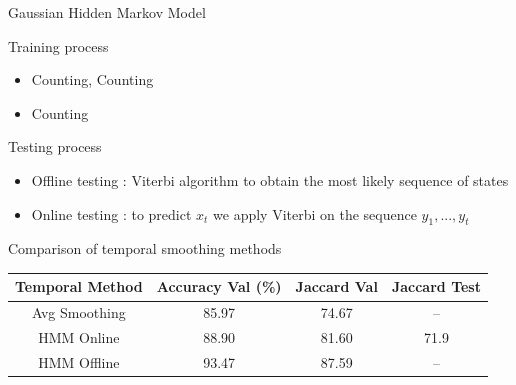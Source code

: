 \begin{frame}{Gaussian Hidden Markov Model}
	
	\begin{block}{Training process}
		\begin{itemize}
			\item Counting, Counting
			\item Counting
		\end{itemize}
	\end{block}
	
	\begin{block}{Testing process}
		\begin{itemize}
			\item Offline testing : Viterbi algorithm to obtain the most likely sequence of states
			\item Online testing : to predict $x_t$ we apply Viterbi on the sequence $y_1,...,y_t$
		\end{itemize}
	\end{block}

\end{frame}
	

\begin{frame}{Comparison of temporal smoothing methods}

	\begin{table}
	\begin{center}
		\begin{tabular}{|c|c|c|c|}
			\hline
			Temporal Method & Accuracy Val (\%) & Jaccard Val & Jaccard Test \\
			\hline\hline
			Avg Smoothing & 85.97 & 74.67 & -- \\
			HMM Online & 88.90 & 81.60 & 71.9 \\
			HMM Offline & 93.47 & 87.59 & -- \\
			\hline
		\end{tabular}
	\end{center}
	\end{table}

\end{frame}

